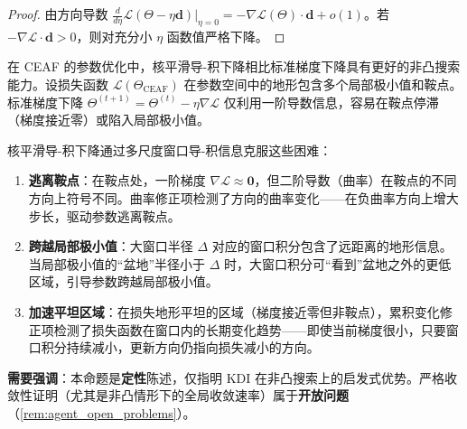 \begin{proof}
由方向导数 $\frac{d}{d\eta}\mathcal{L}(\Theta - \eta\mathbf{d})|_{\eta=0} = -\nabla\mathcal{L}(\Theta)\cdot\mathbf{d} + o(1)$。若 $-\nabla\mathcal{L}\cdot\mathbf{d} > 0$，则对充分小 $\eta$ 函数值严格下降。
\end{proof}

\begin{proposition}\label{prop:kdi_eaf_convergence}
在 CEAF 的参数优化中，核平滑导-积下降相比标准梯度下降具有更好的非凸搜索能力。设损失函数 $\mathcal{L}(\Theta_{\text{CEAF}})$ 在参数空间中的地形包含多个局部极小值和鞍点。标准梯度下降 $\Theta^{(t+1)} = \Theta^{(t)} - \eta \nabla \mathcal{L}$ 仅利用一阶导数信息，容易在鞍点停滞（梯度接近零）或陷入局部极小值。

核平滑导-积下降通过多尺度窗口导-积信息克服这些困难：
\begin{enumerate}[label=(\roman*)]
    \item \textbf{逃离鞍点}：在鞍点处，一阶梯度 $\nabla \mathcal{L} \approx \mathbf{0}$，但二阶导数（曲率）在鞍点的不同方向上符号不同。曲率修正项检测了方向的曲率变化——在负曲率方向上增大步长，驱动参数逃离鞍点。
    \item \textbf{跨越局部极小值}：大窗口半径 $\Delta$ 对应的窗口积分包含了远距离的地形信息。当局部极小值的“盆地”半径小于 $\Delta$ 时，大窗口积分可“看到”盆地之外的更低区域，引导参数跨越局部极小值。
    \item \textbf{加速平坦区域}：在损失地形平坦的区域（梯度接近零但非鞍点），累积变化修正项检测了损失函数在窗口内的长期变化趋势——即使当前梯度很小，只要窗口积分持续减小，更新方向仍指向损失减小的方向。
\end{enumerate}

\textbf{需要强调}：本命题是\textbf{定性}陈述，仅指明 KDI 在非凸搜索上的启发式优势。严格收敛性证明（尤其是非凸情形下的全局收敛速率）属于\textbf{开放问题}（\cref{rem:agent_open_problems}）。
\end{proposition}

